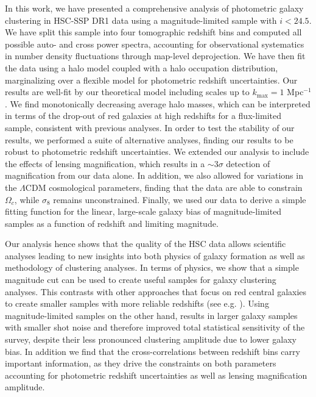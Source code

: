 \documentclass[a4paper,11pt]{article}
\begin{document}
In this work, we have presented a comprehensive analysis of photometric galaxy clustering in HSC-SSP DR1 data using a magnitude-limited sample with $i<24.5$. We have split this sample into four tomographic redshift bins and computed all possible auto- and cross power spectra, accounting for observational systematics in number density fluctuations through map-level deprojection. We have then fit the data using a halo model coupled with a halo occupation distribution, marginalizing over a flexible model for photometric redshift uncertainties. Our results are well-fit by our theoretical model including scales up to $k_{\mathrm{max}} = 1$ Mpc$^{-1}$. We find monotonically decreasing average halo masses, which can be interpreted in terms of the drop-out of red galaxies at high redshifts for a flux-limited sample, consistent with previous analyses. In order to test the stability of our results, we performed a suite of alternative analyses, finding our results to be robust to photometric redshift uncertainties. We extended our analysis to include the effects of lensing magnification, which results in a $\sim 3 \sigma$ detection of magnification from our data alone. In addition, we also allowed for variations in the $\Lambda$CDM cosmological parameters, finding that the data are able to constrain $\Omega_{c}$, while $\sigma_{8}$ remains unconstrained. Finally, we used our data to derive a simple fitting function for the linear, large-scale galaxy bias of magnitude-limited samples as a function of redshift and limiting magnitude. 

Our analysis hence shows that the quality of the HSC data allows scientific analyses leading to new insights into both physics of galaxy formation as well as methodology of clustering analyses. In terms of physics, we show that a simple magnitude cut can be used to create useful samples for galaxy clustering analyses. This contrasts with other approaches that focus on red central galaxies to create smaller samples with more reliable redshifts (see e.g. \cite{1507.05460,1807.10163}). Using magnitude-limited samples on the other hand, results in larger galaxy samples with smaller shot noise and therefore improved total statistical sensitivity of the survey, despite their less pronounced clustering amplitude due to lower galaxy bias. In addition we find that the cross-correlations between redshift bins carry important information, as they drive the constraints on both parameters accounting for photometric redshift uncertainties as well as lensing magnification amplitude.
\end{document}

